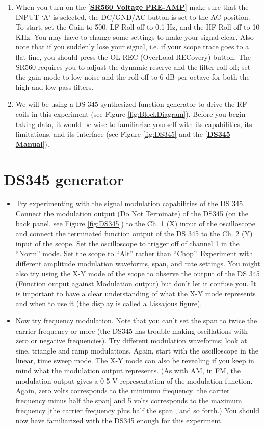 \documentclass{../lab}
\newcommand{\SRVoltagePREAMP}{http://physics111.lib.berkeley.edu/Physics111/Equipment_Manuals/SRS/SR560m.pdf}
\newcommand{\DSManual}{http://physics111.lib.berkeley.edu/Physics111/Equipment_Manuals/SRS/DS345m.pdf}
\begin{document}
\begin{enumerate}
    \item When you turn on the [\href{\SRVoltagePREAMP}{\textbf{SR560 Voltage PRE-AMP}}] make sure that the INPUT ‘A' is selected, the DC/GND/AC button is set to the AC position. To start, set the Gain to 500, LF Roll-off to 0.1 Hz, and the HF Roll-off to 10 KHz. You may have to change some settings to make your signal clear. Also note that if you suddenly lose your signal, i.e. if your scope trace goes to a flat-line, you should press the OL REC (OverLoad RECovery) button. The SR560 requires you to adjust the dynamic reserve and the filter roll-off; set the gain mode to low noise and the roll off to 6 dB per octave for both the high and low pass filters.

    \item We will be using a DS 345 synthesized function generator to drive the RF coils in this experiment (see Figure \ref{fig:BlockDiagram}). Before you begin taking data, it would be wise to familiarize yourself with its capabilities, its limitations, and its interface (see Figure \ref{fig:DS345} and the [\href{\DSManual}{\textbf{DS345 Manual}}]).
\end{enumerate}

\section{DS345 generator}
\begin{itemize}
    \item Try experimenting with the signal modulation capabilities of the DS 345. Connect the modulation output (Do Not Terminate) of the DS345 (on the back panel, see Figure \ref{fig:DS345}) to the Ch. 1 (X) input of the oscilloscope and connect the terminated function output of the DS 345 to the Ch. 2 (Y) input of the scope. Set the oscilloscope to trigger off of channel 1 in the ``Norm'' mode. Set the scope to ``Alt'' rather than ``Chop''. Experiment with different amplitude modulation waveforms, span, and rate settings. You might also try using the X-Y mode of the scope to observe the output of the DS 345 (Function output against Modulation output) but don't let it confuse you. It is important to have a clear understanding of what the X-Y mode represents and when to use it (the display is called a Lissajous figure).

    \item Now try frequency modulation. Note that you can't set the span to twice the carrier frequency or more (the DS345 has trouble making oscillations with zero or negative frequencies). Try different modulation waveforms; look at sine, triangle and ramp modulations. Again, start with the oscilloscope in the linear, time sweep mode. The X-Y mode can also be revealing if you keep in mind what the modulation output represents. (As with AM, in FM, the modulation output gives a 0-5 V representation of the modulation function. Again, zero volts corresponds to the minimum frequency [the carrier frequency minus half the span] and 5 volts corresponds to the maximum frequency [the carrier frequency plus half the span], and so forth.) You should now have familiarized with the DS345 enough for this experiment.
\end{itemize}
\end{document}
